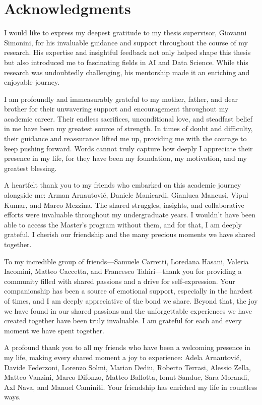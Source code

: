 \chapter*{Acknowledgments}
\normalsize
I would like to express my deepest gratitude to my thesis supervisor, Giovanni Simonini, for his invaluable guidance and support throughout the course of my research. His expertise and insightful feedback not only helped shape this thesis but also introduced me to fascinating fields in AI and Data Science. While this research was undoubtedly challenging, his mentorship made it an enriching and enjoyable journey.

I am profoundly and immeasurably grateful to my mother, father, and dear brother for their unwavering support and encouragement throughout my academic career. Their endless sacrifices, unconditional love, and steadfast belief in me have been my greatest source of strength. In times of doubt and difficulty, their guidance and reassurance lifted me up, providing me with the courage to keep pushing forward. Words cannot truly capture how deeply I appreciate their presence in my life, for they have been my foundation, my motivation, and my greatest blessing.

A heartfelt thank you to my friends who embarked on this academic journey alongside me: Arman Arnautović, Daniele Manicardi, Gianluca Mancusi, Vipul Kumar, and Marco Mezzina. The shared struggles, insights, and collaborative efforts were invaluable throughout my undergraduate years. I wouldn’t have been able to access the Master’s program without them, and for that, I am deeply grateful. I cherish our friendship and the many precious moments we have shared together.

To my incredible group of friends—Samuele Carretti, Loredana Hasani, Valeria Iacomini, Matteo Caccetta, and Francesco Tahiri—thank you for providing a community filled with shared passions and a drive for self-expression. Your companionship has been a source of emotional support, especially in the hardest of times, and I am deeply appreciative of the bond we share. Beyond that, the joy we have found in our shared passions and the unforgettable experiences we have created together have been truly invaluable. I am grateful for each and every moment we have spent together.

A profound thank you to all my friends who have been a welcoming presence in my life, making every shared moment a joy to experience: Adela Arnautović, Davide Federzoni, Lorenzo Solmi, Marian Dediu, Roberto Terrasi, Alessio Zella, Matteo Vanzini, Marco Difonzo, Matteo Ballotta, Ionut Sanduc, Sara Morandi, Axl Nava, and Manuel Caminiti. Your friendship has enriched my life in countless ways.

